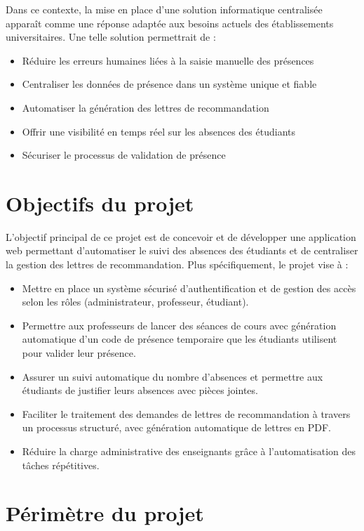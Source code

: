 \documentclass[12pt, a4paper, openright]{report}
\begin{document}
Dans ce contexte, la mise en place d'une solution informatique centralisée apparaît comme une réponse adaptée aux besoins actuels des établissements universitaires. Une telle solution permettrait de :

\begin{itemize}
    \item Réduire les erreurs humaines liées à la saisie manuelle des présences
    \item Centraliser les données de présence dans un système unique et fiable
    \item Automatiser la génération des lettres de recommandation
    \item Offrir une visibilité en temps réel sur les absences des étudiants
    \item Sécuriser le processus de validation de présence
\end{itemize}

\section{Objectifs du projet}

L'objectif principal de ce projet est de concevoir et de développer une application web permettant d'automatiser le suivi des absences des étudiants et de centraliser la gestion des lettres de recommandation. Plus spécifiquement, le projet vise à :

\begin{itemize}
    \item Mettre en place un système sécurisé d'authentification et de gestion des accès selon les rôles (administrateur, professeur, étudiant).
    \item Permettre aux professeurs de lancer des séances de cours avec génération automatique d'un code de présence temporaire que les étudiants utilisent pour valider leur présence.
    \item Assurer un suivi automatique du nombre d'absences et permettre aux étudiants de justifier leurs absences avec pièces jointes.
    \item Faciliter le traitement des demandes de lettres de recommandation à travers un processus structuré, avec génération automatique de lettres en PDF.
    \item Réduire la charge administrative des enseignants grâce à l'automatisation des tâches répétitives.
\end{itemize}

\section{Périmètre du projet}
\end{document}
